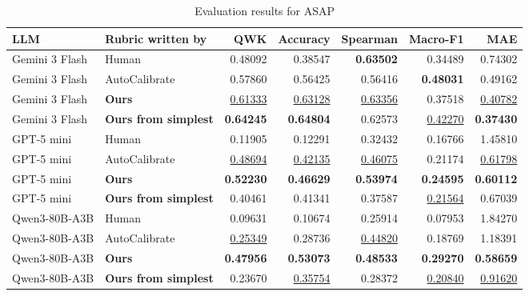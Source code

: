 \begin{table}[t]
\centering
\caption{Evaluation results for ASAP}
\begin{tabular}{llrrrrr}
\toprule
LLM & Rubric written by & QWK & Accuracy & Spearman & Macro-F1 & MAE \\
\midrule
Gemini 3 Flash & Human & 0.48092 & 0.38547 & \textbf{0.63502} & 0.34489 & 0.74302 \\
Gemini 3 Flash & AutoCalibrate & 0.57860 & 0.56425 & 0.56416 & \textbf{0.48031} & 0.49162 \\
Gemini 3 Flash & \textbf{Ours} & \underline{0.61333} & \underline{0.63128} & \underline{0.63356} & 0.37518 & \underline{0.40782} \\
Gemini 3 Flash & \textbf{Ours from simplest} & \textbf{0.64245} & \textbf{0.64804} & 0.62573 & \underline{0.42270} & \textbf{0.37430} \\
\midrule
GPT-5 mini & Human & 0.11905 & 0.12291 & 0.32432 & 0.16766 & 1.45810 \\
GPT-5 mini & AutoCalibrate & \underline{0.48694} & \underline{0.42135} & \underline{0.46075} & 0.21174 & \underline{0.61798} \\
GPT-5 mini & \textbf{Ours} & \textbf{0.52230} & \textbf{0.46629} & \textbf{0.53974} & \textbf{0.24595} & \textbf{0.60112} \\
GPT-5 mini & \textbf{Ours from simplest} & 0.40461 & 0.41341 & 0.37587 & \underline{0.21564} & 0.67039 \\
\midrule
Qwen3-80B-A3B & Human & 0.09631 & 0.10674 & 0.25914 & 0.07953 & 1.84270 \\
Qwen3-80B-A3B & AutoCalibrate & \underline{0.25349} & 0.28736 & \underline{0.44820} & 0.18769 & 1.18391 \\
Qwen3-80B-A3B & \textbf{Ours} & \textbf{0.47956} & \textbf{0.53073} & \textbf{0.48533} & \textbf{0.29270} & \textbf{0.58659} \\
Qwen3-80B-A3B & \textbf{Ours from simplest} & 0.23670 & \underline{0.35754} & 0.28372 & \underline{0.20840} & \underline{0.91620} \\
\bottomrule
\end{tabular}
\end{table}

